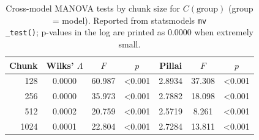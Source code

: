 \begin{table}[H]
\centering
\caption{Cross-model MANOVA tests by chunk size for $C(\mathrm{group})$ (group = model). Reported from statsmodels \texttt{mv\\_test()}; p-values in the log are printed as 0.0000 when extremely small.}
\label{tab:cross-manova-mvtest}
\small
\begin{tabular}{rcccccc}
\toprule
Chunk & Wilks' $\Lambda$ & $F$ & $p$ & Pillai & $F$ & $p$ \\
\midrule
128 & 0.0000 & 60.987 & <0.001 & 2.8934 & 37.308 & <0.001 \\
256 & 0.0000 & 35.973 & <0.001 & 2.7882 & 18.098 & <0.001 \\
512 & 0.0002 & 20.759 & <0.001 & 2.5719 & 8.261 & <0.001 \\
1024 & 0.0001 & 22.804 & <0.001 & 2.7284 & 13.811 & <0.001 \\
\bottomrule
\end{tabular}
\end{table}

